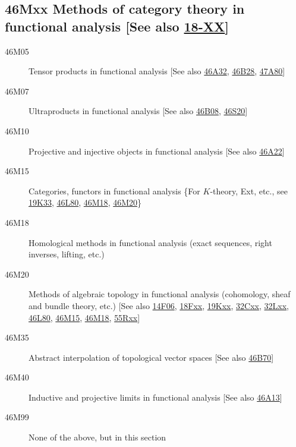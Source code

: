 \subsection*{46Mxx  Methods of category theory in functional analysis [See also \hyperref[18-XX]{18-XX}] }\label{46Mxx}
\begin{description} 
\item [46M05]\label{46M05} Tensor products in functional analysis [See also \hyperref[46A32]{46A32}, \hyperref[46B28]{46B28}, \hyperref[47A80]{47A80}]
\item [46M07]\label{46M07} Ultraproducts in functional analysis [See also \hyperref[46B08]{46B08}, \hyperref[46S20]{46S20}]
\item [46M10]\label{46M10} Projective and injective objects in functional analysis [See also \hyperref[46A22]{46A22}]
\item [46M15]\label{46M15} Categories, functors  in functional analysis \{For $K$-theory, Ext, etc., see \hyperref[19K33]{19K33}, \hyperref[46L80]{46L80}, \hyperref[46M18]{46M18}, \hyperref[46M20]{46M20}\}
\item [46M18]\label{46M18} Homological methods in functional analysis (exact sequences, right inverses, lifting, etc.)
\item [46M20]\label{46M20} Methods of algebraic topology in functional analysis (cohomology, sheaf and bundle theory, etc.) [See also \hyperref[14F06]{14F06}, \hyperref[18Fxx]{18Fxx}, \hyperref[19Kxx]{19Kxx}, \hyperref[32Cxx]{32Cxx}, \hyperref[32Lxx]{32Lxx}, \hyperref[46L80]{46L80}, \hyperref[46M15]{46M15}, \hyperref[46M18]{46M18}, \hyperref[55Rxx]{55Rxx}]
\item [46M35]\label{46M35} Abstract interpolation of topological vector spaces [See also \hyperref[46B70]{46B70}]
\item [46M40]\label{46M40} Inductive and projective limits in functional analysis [See also \hyperref[46A13]{46A13}]
\item [46M99]\label{46M99} None of the above, but in this section
\end{description}
